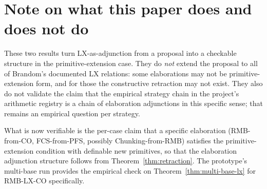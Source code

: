 \documentclass[11pt]{article}
\begin{document}
\section{Note on what this paper does and does not do}

These two results turn LX-as-adjunction from a proposal into a
checkable structure in the primitive-extension case. They do
\emph{not} extend the proposal to all of Brandom's documented LX
relations: some elaborations may not be primitive-extension form,
and for those the constructive retraction may not exist. They also
do not validate the claim that the empirical strategy chain in the
project's arithmetic registry is a chain of elaboration adjunctions in this
specific sense; that remains an empirical question per strategy.

What is now verifiable is the per-case claim that a specific
elaboration (RMB-from-CO, FCS-from-PFS, possibly Chunking-from-RMB)
satisfies the primitive-extension condition with definable new
primitives, so that the elaboration adjunction structure follows from
Theorem~\ref{thm:retraction}. The prototype's multi-base run
provides the empirical check on Theorem~\ref{thm:multi-base-lx} for
RMB-LX-CO specifically.

\printbibliography
\end{document}
